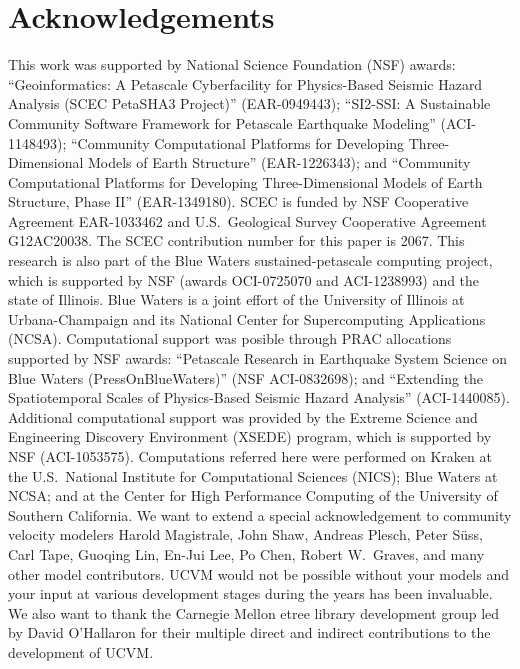 
\section{Acknowledgements}

This work was supported by National Science Foundation (NSF) awards: ``Geoinformatics: A Petascale Cyberfacility for Physics-Based Seismic Hazard Analysis (SCEC PetaSHA3 Project)'' (EAR-0949443); ``SI2-SSI: A Sustainable Community Software Framework for Petascale Earthquake Modeling'' (ACI-1148493); ``Community Computational Platforms for Developing Three-Dimensional Models of Earth Structure'' (EAR-1226343); and ``Community Computational Platforms for Developing Three-Dimensional Models of Earth Structure, Phase II'' (EAR-1349180). SCEC is funded by NSF Cooperative Agreement EAR-1033462 and U.S.~Geological Survey Cooperative Agreement G12AC20038. The SCEC contribution number for this paper is 2067. This research is also part of the Blue Waters sustained-petascale computing project, which is supported by NSF (awards OCI-0725070 and ACI-1238993) and the state of Illinois. Blue Waters is a joint effort of the University of Illinois at Urbana-Champaign and its National Center for Supercomputing Applications (NCSA). Computational support was posible through PRAC allocations supported by NSF awards: ``Petascale Research in Earthquake System Science on Blue Waters (PressOnBlueWaters)'' (NSF ACI-0832698); and ``Extending the Spatiotemporal Scales of Physics-Based Seismic Hazard Analysis'' (ACI-1440085). Additional computational support was provided by the Extreme Science and Engineering Discovery Environment (XSEDE) program, which is supported by NSF (ACI-1053575). Computations referred here were performed on Kraken at the U.S.~National Institute for Computational Sciences (NICS); Blue Waters at NCSA; and at the Center for High Performance Computing of the University of Southern California. We want to extend a special acknowledgement to community velocity modelers Harold Magistrale, John Shaw, Andreas Plesch, Peter S\"{u}ss, Carl Tape, Guoqing Lin, En-Jui Lee, Po Chen, Robert W.~Graves, and many other model contributors. UCVM would not be possible without your models and your input at various development stages during the years has been invaluable. We also want to thank the Carnegie Mellon etree library development group led by David O'Hallaron for their multiple direct and indirect contributions to the development of UCVM.
